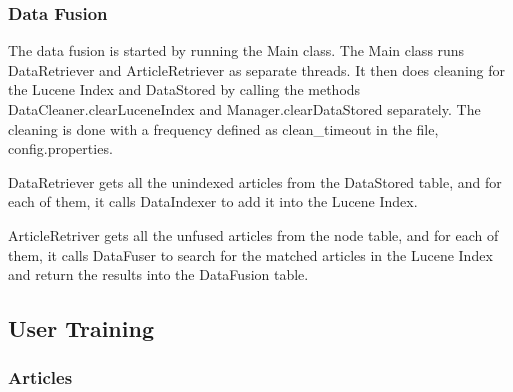 \documentclass[10pt]{article} %
\begin{document}
\subsubsection{Data Fusion}

The data fusion is started by running the Main class. The Main class runs DataRetriever and ArticleRetriever as separate threads. It then does cleaning for the Lucene Index and DataStored by calling the methods DataCleaner.clearLuceneIndex and Manager.clearDataStored separately. The cleaning is done with a frequency defined as clean\_timeout in the file, config.properties.

DataRetriever gets all the unindexed articles from the DataStored table, and for each of them, it calls DataIndexer to add it into the Lucene Index.

ArticleRetriver gets all the unfused articles from the node table, and for each of them, it calls DataFuser to search for the matched articles in the Lucene Index and return the results into the DataFusion table. 

\subsection{User Training}

\subsubsection{Articles}
\end{document}
